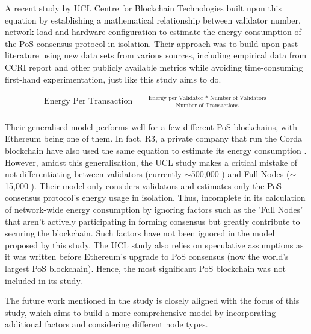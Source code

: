 A recent study by UCL Centre for Blockchain Technologies \cite{PlattDiscussionProof-of-Work} built upon this equation by establishing a mathematical relationship between validator number, network load and hardware configuration to estimate the energy consumption of the PoS consensus protocol in isolation. Their approach was to build upon past literature using new data sets from various sources, including empirical data from CCRI report \cite{CryptoCarbonRatingsInstitute2022TheNetwork} and other publicly available metrics while avoiding time-consuming first-hand experimentation, just like this study aims to do. 

\begin{align}
   \boldsymbol{\mathrm{\text{Energy Per Transaction} = }}
   &\boldsymbol{\mathrm{\frac{\text{ Energy per Validator }* \text{ Number of Validators } }{\text{ Number of Transactions }}} } \nonumber\\ \nonumber
\end{align}

Their generalised model performs well for a few different PoS blockchains, with Ethereum being one of them. In fact, R3, a private company that run the Corda blockchain have also used the same equation to estimate its energy consumption \cite{JustBlog}. However, amidst this generalisation, the UCL study makes a critical mistake of not differentiating between validators (currently $\sim$500,000 \cite{EthereumEthereum.orgc}) and Full Nodes ($\sim$15,000 \cite{NodewatchAnalytics}). Their model only considers validators and estimates only the PoS consensus protocol’s energy usage in isolation. Thus, incomplete in its calculation of network-wide energy consumption by ignoring factors such as the 'Full Nodes' that aren't actively participating in forming consensus but greatly contribute to securing the blockchain. Such factors have not been ignored in the model proposed by this study. The UCL study also relies on speculative assumptions as it was written before Ethereum’s upgrade to PoS consensus (now the world’s largest PoS blockchain). Hence, the most significant PoS blockchain was not included in its study.

The future work mentioned in the study is closely aligned with the focus of this study, which aims to build a more comprehensive model by incorporating additional factors and considering different node types.


